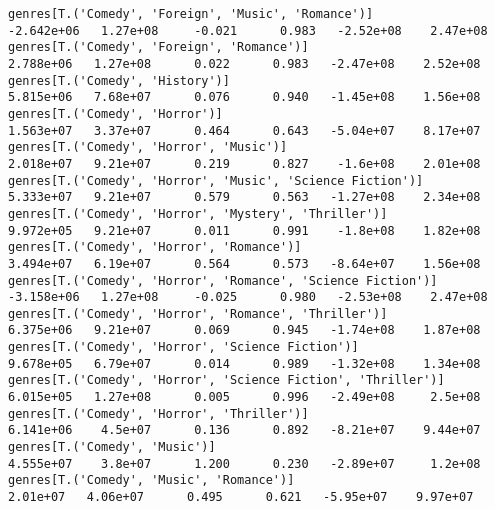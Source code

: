 \documentclass[11pt]{article}
\begin{document}
\begin{Verbatim}[commandchars=\\\{\}]
genres[T.('Comedy', 'Foreign', 'Music', 'Romance')]                                                          -2.642e+06   1.27e+08     -0.021      0.983   -2.52e+08    2.47e+08
genres[T.('Comedy', 'Foreign', 'Romance')]                                                                    2.788e+06   1.27e+08      0.022      0.983   -2.47e+08    2.52e+08
genres[T.('Comedy', 'History')]                                                                               5.815e+06   7.68e+07      0.076      0.940   -1.45e+08    1.56e+08
genres[T.('Comedy', 'Horror')]                                                                                1.563e+07   3.37e+07      0.464      0.643   -5.04e+07    8.17e+07
genres[T.('Comedy', 'Horror', 'Music')]                                                                       2.018e+07   9.21e+07      0.219      0.827    -1.6e+08    2.01e+08
genres[T.('Comedy', 'Horror', 'Music', 'Science Fiction')]                                                    5.333e+07   9.21e+07      0.579      0.563   -1.27e+08    2.34e+08
genres[T.('Comedy', 'Horror', 'Mystery', 'Thriller')]                                                         9.972e+05   9.21e+07      0.011      0.991    -1.8e+08    1.82e+08
genres[T.('Comedy', 'Horror', 'Romance')]                                                                     3.494e+07   6.19e+07      0.564      0.573   -8.64e+07    1.56e+08
genres[T.('Comedy', 'Horror', 'Romance', 'Science Fiction')]                                                 -3.158e+06   1.27e+08     -0.025      0.980   -2.53e+08    2.47e+08
genres[T.('Comedy', 'Horror', 'Romance', 'Thriller')]                                                         6.375e+06   9.21e+07      0.069      0.945   -1.74e+08    1.87e+08
genres[T.('Comedy', 'Horror', 'Science Fiction')]                                                             9.678e+05   6.79e+07      0.014      0.989   -1.32e+08    1.34e+08
genres[T.('Comedy', 'Horror', 'Science Fiction', 'Thriller')]                                                 6.015e+05   1.27e+08      0.005      0.996   -2.49e+08     2.5e+08
genres[T.('Comedy', 'Horror', 'Thriller')]                                                                    6.141e+06    4.5e+07      0.136      0.892   -8.21e+07    9.44e+07
genres[T.('Comedy', 'Music')]                                                                                 4.555e+07    3.8e+07      1.200      0.230   -2.89e+07     1.2e+08
genres[T.('Comedy', 'Music', 'Romance')]                                                                       2.01e+07   4.06e+07      0.495      0.621   -5.95e+07    9.97e+07

\end{Verbatim}
\end{document}
